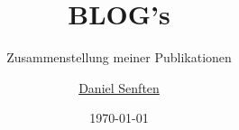 \documentclass{manual}
\title{BLOG's}
\subtitle{Zusammenstellung meiner Publikationen}
\date{\today}
\author{\href{mailto:daniel.senften@talent-factory.ch}{Daniel Senften}}
\begin{document}


\newpage\appendix
\listofexercises

\renewcommand{\listoflistingscaption}{Programmbeispiele}
\newpage\listoflistings
\end{document}
